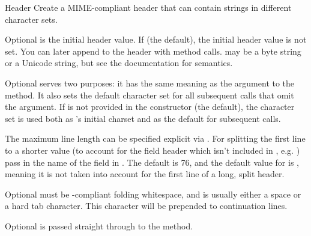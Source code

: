 \begin{classdesc}{Header}{}
Create a MIME-compliant header that can contain strings in different
character sets.

Optional  is the initial header value.  If  (the
default), the initial header value is not set.  You can later append
to the header with  method calls.   may be a
byte string or a Unicode string, but see the 
documentation for semantics.

Optional  serves two purposes: it has the same meaning as
the  argument to the  method.  It also
sets the default character set for all subsequent 
calls that omit the  argument.  If  is not
provided in the constructor (the default), the 
character set is used both as 's initial charset and as the
default for subsequent  calls.

The maximum line length can be specified explicit via
.  For splitting the first line to a shorter value (to
account for the field header which isn't included in ,
e.g. ) pass in the name of the field in
.  The default  is 76, and the
default value for  is , meaning it is not
taken into account for the first line of a long, split header.

Optional  must be -compliant folding
whitespace, and is usually either a space or a hard tab character.
This character will be prepended to continuation lines.
\end{classdesc}

Optional  is passed straight through to the
 method.

